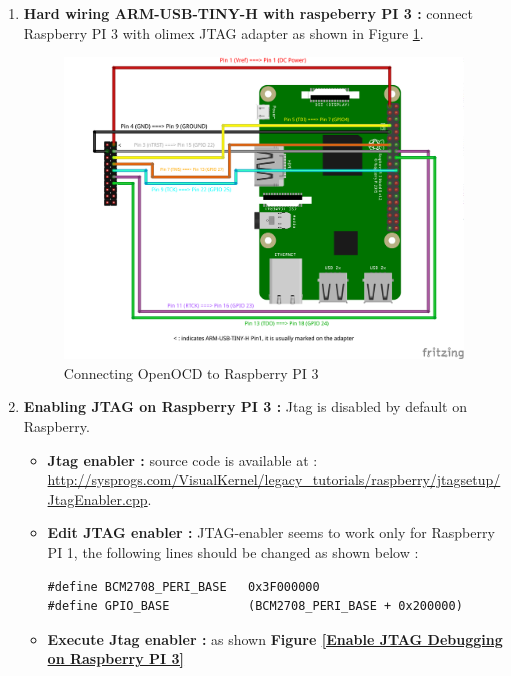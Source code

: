 \begin{enumerate}
		\begin{enumerate}
			\item \textbf{Hard wiring ARM-USB-TINY-H with raspeberry PI 3 : } connect Raspberry PI 3 with olimex JTAG adapter as shown in {Figure \ref{Connecting OpenOCD to Raspberry PI 3}}.
				\begin{figure}[H]
					\centering
        				\includegraphics[scale=0.50]{img/solution/raspberry-PI-3-openocd-wiring.png}
        				\caption{Connecting OpenOCD to Raspberry PI 3}
        				\label{Connecting OpenOCD to Raspberry PI 3}
    			\end{figure}
    	
    		\item \textbf{Enabling JTAG on Raspberry PI 3 : } Jtag is disabled by default on Raspberry.
    			\begin{itemize}
    				\item \textbf{Jtag enabler : } source code is available at : {\color{blue}\url{http://sysprogs.com/VisualKernel/legacy\_tutorials/raspberry/jtagsetup/JtagEnabler.cpp}}.
    				
    				\item \textbf{Edit JTAG enabler : } JTAG-enabler seems to work only for Raspberry PI 1, the following lines should be changed as shown below :

		\begin{lstlisting}[style=CStyle]
#define BCM2708_PERI_BASE	0x3F000000
#define GPIO_BASE			(BCM2708_PERI_BASE + 0x200000)
		\end{lstlisting}
					\item \textbf{Execute Jtag enabler : } as shown \textbf{Figure \ref{Enable JTAG Debugging on Raspberry PI 3}}
					


\end{itemize}
\end{enumerate}
\end{enumerate}
